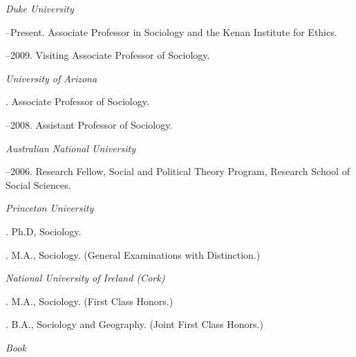 \documentclass[11pt]{article}
\begin{document}
\noindent\emph{Duke University \vspace{0.01in}}

--Present. Associate Professor in Sociology and the Kenan Institute for Ethics.      

--2009. Visiting Associate Professor of Sociology.

\medskip
\noindent\emph{University of Arizona \vspace{0.01in}}

. Associate Professor of Sociology.

--2008. Assistant Professor of Sociology.

\medskip

\noindent\emph{Australian National University \vspace{0.01in}}

--2006. Research Fellow, Social and Political Theory Program,
Research School of Social Sciences.

\bigskip



\noindent\emph{Princeton University \vspace{0.01in}}

. Ph.D, Sociology. %



. M.A., Sociology. (General Examinations with Distinction.)


\medskip
\noindent\emph{National University of Ireland (Cork)\vspace{0.02in}}

. M.A., Sociology. (First Class Honors.) \vspace{0.01in}


. B.A., Sociology and Geography. (Joint First Class Honors.) 

\bigskip
 
\medskip
\noindent\emph{Book \vspace{0.01in}}
\end{document}
